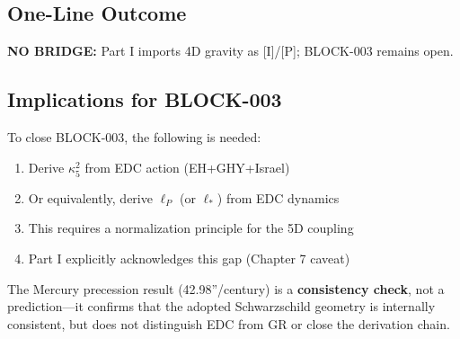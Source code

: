 \documentclass[11pt,a4paper]{article}
\begin{document}
\subsection{One-Line Outcome}

\begin{tcolorbox}[colback=gray!10,colframe=black]
\textbf{NO BRIDGE:} Part I imports 4D gravity as [I]/[P]; BLOCK-003 remains open.
\end{tcolorbox}

\subsection{Implications for BLOCK-003}

To close BLOCK-003, the following is needed:
\begin{enumerate}
    \item Derive $\kappa_5^2$ from EDC action (EH+GHY+Israel)
    \item Or equivalently, derive $\ell_P$ (or $\ell_*$) from EDC dynamics
    \item This requires a normalization principle for the 5D coupling
    \item Part I explicitly acknowledges this gap (Chapter 7 caveat)
\end{enumerate}

The Mercury precession result (42.98''/century) is a \textbf{consistency check}, not a prediction---it confirms that the adopted Schwarzschild geometry is internally consistent, but does not distinguish EDC from GR or close the derivation chain.
\end{document}
